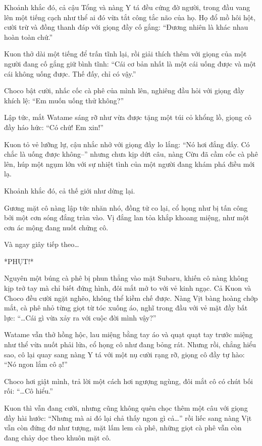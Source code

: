 \documentclass[../main.tex]{subfiles}
\begin{document}
Khoảnh khắc đó, cả cậu Tổng và nàng Y tá đều cứng đờ người, trong đầu vang lên một tiếng cạch như thể ai đó vừa tắt công tắc não của họ. Họ đổ mồ hôi hột, cười trừ và đồng thanh đáp với giọng đầy cố gắng: ``Đương nhiên là khác nhau hoàn toàn chứ.''

Kuon thở dài một tiếng để trấn tĩnh lại, rồi giải thích thêm với giọng của một người đang cố gắng giữ bình tĩnh: ``Cái cơ bản nhất là một cái uống được và một cái không uống được. Thế đấy, chỉ có vậy.''

Choco bật cười, nhấc cốc cà phê của mình lên, nghiêng đầu hỏi với giọng đầy khích lệ: ``Em muốn uống thử không?''

Lập tức, mắt Watame sáng rỡ như vừa được tặng một túi cỏ khổng lồ, giọng cô đầy háo hức: ``Có chứ! Em xin!''

Kuon tỏ vẻ lưỡng lự, cậu nhắc nhở với giọng đầy lo lắng: ``Nó hơi đắng đấy. Có chắc là uống được không--'' nhưng chưa kịp dứt câu, nàng Cừu đã cầm cốc cà phê lên, húp một ngụm lớn với sự nhiệt tình của một người đang khám phá điều mới lạ.

Khoảnh khắc đó, cả thế giới như dừng lại.

Gương mặt cô nàng lập tức nhăn nhó, đồng tử co lại, cổ họng như bị tấn công bởi một cơn sóng đắng tràn vào. Vị đắng lan tỏa khắp khoang miệng, như một cơn ác mộng đang nuốt chửng cô.

Và ngay giây tiếp theo\dots

*PHỤT!*


Nguyên một búng cà phê bị phun thẳng vào mặt Subaru, khiến cô nàng không kịp trở tay mà chỉ biết đứng hình, đôi mắt mở to với vẻ kinh ngạc. Cả Kuon và Choco đều cười ngặt nghẽo, không thể kiềm chế được. Nàng Vịt bàng hoàng chớp mắt, cà phê nhỏ từng giọt từ tóc xuống áo, nghĩ trong đầu với vẻ mặt đầy bất lực: ``\dots Cái gì vừa xảy ra với cuộc đời mình vậy?''

Watame vẫn thở hồng hộc, lau miệng bằng tay áo và quạt quạt tay trước miệng như thể vừa nuốt phải lửa, cổ họng cô như đang bỏng rát. Nhưng rồi, chẳng hiểu sao, cô lại quay sang nàng Y tá với một nụ cười rạng rỡ, giọng cô đầy tự hào: ``Nó ngon lắm cô ạ!''

Choco hơi giật mình, trả lời một cách hơi ngượng ngùng, đôi mắt cô có chút bối rối: ``\dots Cô hiểu.''

Kuon thì vẫn đang cười, nhưng cũng không quên chọc thêm một câu với giọng đầy hài hước: ``Nhưng mà ai đó lại chả thấy ngon gì cả\dots'' rồi liếc sang nàng Vịt vẫn còn đứng đơ như tượng, mặt lấm lem cà phê, những giọt cà phê vẫn còn đang chảy dọc theo khuôn mặt cô.
\end{document}
